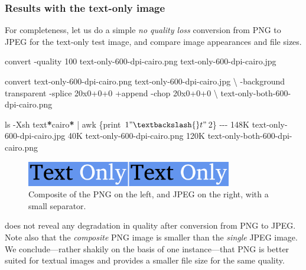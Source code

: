 \documentclass[
  11pt,
  british,
  a4paper,
]{article}
\newenvironment{Shaded}{\begin{snugshade}}{\end{snugshade}}
\newcommand{\AttributeTok}[1]{\textcolor[rgb]{0.80,0.80,0.80}{#1}}
\newcommand{\DataTypeTok}[1]{\textcolor[rgb]{0.87,0.87,0.75}{#1}}
\newcommand{\ExtensionTok}[1]{\textcolor[rgb]{0.80,0.80,0.80}{#1}}
\newcommand{\FunctionTok}[1]{\textcolor[rgb]{0.94,0.94,0.56}{#1}}
\newcommand{\KeywordTok}[1]{\textcolor[rgb]{0.94,0.87,0.69}{#1}}
\newcommand{\NormalTok}[1]{\textcolor[rgb]{0.80,0.80,0.80}{#1}}
\newcommand{\PreprocessorTok}[1]{\textcolor[rgb]{1.00,0.81,0.69}{\textbf{#1}}}
\newcommand{\StringTok}[1]{\textcolor[rgb]{0.80,0.58,0.58}{#1}}
\begin{document}
\hypertarget{results-with-the-text-only-image}{%
\subsubsection{Results with the text-only
image}\label{results-with-the-text-only-image}}

For completeness, let us do a simple \emph{no quality loss} conversion
from PNG to JPEG for the text-only test image, and compare image
appearances and file sizes.

\begin{Shaded}
\begin{Highlighting}[]
\ExtensionTok{convert} \AttributeTok{{-}quality}\NormalTok{ 100 text{-}only{-}600{-}dpi{-}cairo.png text{-}only{-}600{-}dpi{-}cairo.jpg}

\ExtensionTok{convert}\NormalTok{ text{-}only{-}600{-}dpi{-}cairo.png text{-}only{-}600{-}dpi{-}cairo.jpg }\DataTypeTok{\textbackslash{}}
\NormalTok{{-}background transparent }\AttributeTok{{-}splice}\NormalTok{ 20x0+0+0 +append }\AttributeTok{{-}chop}\NormalTok{ 20x0+0+0 }\DataTypeTok{\textbackslash{}}
\NormalTok{text{-}only{-}both{-}600{-}dpi{-}cairo.png}

\FunctionTok{ls} \AttributeTok{{-}Xsh}\NormalTok{ text}\PreprocessorTok{*}\NormalTok{cairo}\PreprocessorTok{*} \KeywordTok{|} \FunctionTok{awk} \StringTok{\textquotesingle{}\{print $1 "\textbackslash{}t" $2\}\textquotesingle{}}
\ExtensionTok{{-}{-}{-}}
\ExtensionTok{148K}\NormalTok{    text{-}only{-}600{-}dpi{-}cairo.jpg}
\ExtensionTok{40K}\NormalTok{     text{-}only{-}600{-}dpi{-}cairo.png}
\ExtensionTok{120K}\NormalTok{    text{-}only{-}both{-}600{-}dpi{-}cairo.png}
\end{Highlighting}
\end{Shaded}

\begin{figure}
\hypertarget{fig:text-only-both}{%
\centering
\includegraphics[width=0.8\textwidth,height=\textheight]{images/text-only-both-600-dpi-cairo.png}
\caption{Composite of the PNG on the left, and JPEG on the right, with a
small separator.}\label{fig:text-only-both}
}
\end{figure}

 does not reveal any degradation in quality
after conversion from PNG to JPEG. Note also that the \emph{composite}
PNG image is smaller than the \emph{single} JPEG image. We
conclude---rather shakily on the basis of one instance---that PNG is
better suited for textual images and provides a smaller file size for
the same quality.
\end{document}
